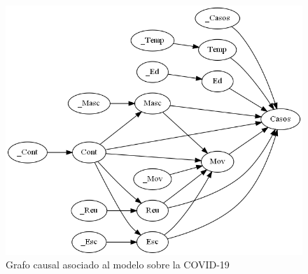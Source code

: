 \begin{figure}[h]
	\centering
	\includegraphics[width=\linewidth]{./images/Chapter-4/covid-graph}
	\caption{Grafo causal asociado al modelo sobre la COVID-19}
	\label{fig:covid-graph}
\end{figure}

